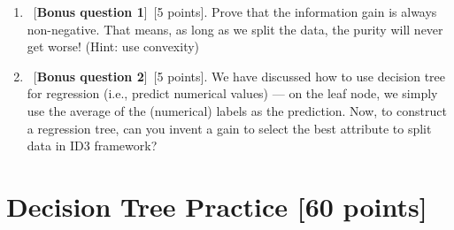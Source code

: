 \documentclass[12pt, fullpage,letterpaper]{article}
\begin{document}
\begin{enumerate}
\begin{enumerate}
\end{enumerate}
\item ~[\textbf{Bonus question 1}]~[5 points].  Prove that the information gain is always non-negative.  That means, as long as we split the data, the purity will never get worse! (Hint: use convexity)
\item ~[\textbf{Bonus question 2}]~[5 points].  We have discussed how to use decision tree for regression (i.e., predict numerical values) --- on the leaf node, we simply use the average of the (numerical) labels as the prediction.  Now, to construct a regression tree, can you invent a gain to select the best attribute to split data in ID3 framework?

\end{enumerate}

\section{Decision Tree Practice [60 points]}
\end{document}
